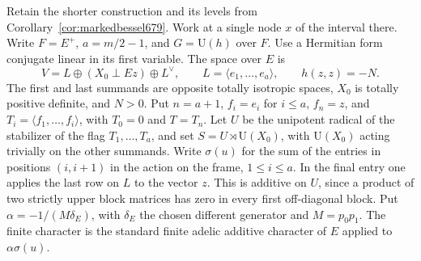\documentclass[a4paper,11pt]{article}
\theoremstyle{definition}
\theoremstyle{remark}
\numberwithin{equation}{section}
\begin{document}
Retain the shorter construction and its levels from
Corollary~\ref{cor:markedbessel679}. Work at a single node \(x\) of
the interval there. Write \(F=E^+\), \(a=m/2-1\), and \(G=\mathrm U(h)\)
over \(F\). Use a Hermitian form conjugate linear in its first
variable. The space over \(E\) is
\[
 V=L\oplus (X_0\perp Ez)\oplus L^\vee,\qquad
 L=\langle e_1,\ldots,e_a\rangle,\qquad h(z,z)=-N .
\]
The first and last summands are opposite totally isotropic spaces,
\(X_0\) is totally positive definite, and \(N>0\). Put \(n=a+1\),
\(f_i=e_i\) for \(i\le a\), \(f_n=z\), and
\(T_i=\langle f_1,\ldots,f_i\rangle\), with \(T_0=0\) and \(T=T_n\).
Let \(U\) be the unipotent radical of the stabilizer of the flag
\(T_1,\ldots,T_a\), and set \(S=U\rtimes\mathrm U(X_0)\), with
\(\mathrm U(X_0)\) acting trivially on the other summands. Write
\(\sigma(u)\) for the sum of the entries in positions \((i,i+1)\)
in the action on the frame, \(1\le i\le a\). In the final entry
one applies the last row on \(L\) to the vector \(z\). This is
additive on \(U\), since a product of two strictly upper block
matrices has zero in every first off-diagonal block. Put
\(\alpha=-1/(M\delta_E)\), with \(\delta_E\) the chosen different
generator and \(M=p_0p_1\). The finite character is the standard
finite adelic additive character of \(E\) applied to
\(\alpha\sigma(u)\).
\end{document}
